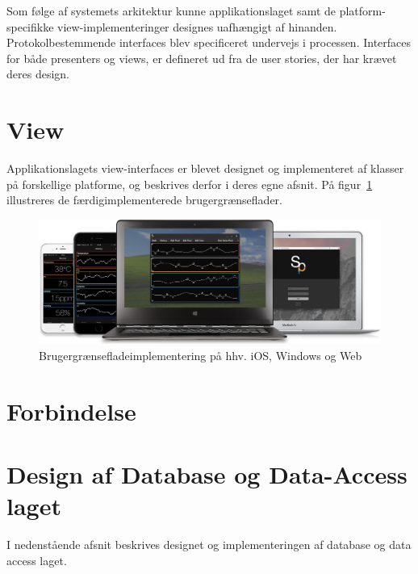 Som følge af systemets arkitektur kunne applikationslaget samt de platform-specifikke view-implementeringer
designes uafhængigt af hinanden. Protokolbestemmende interfaces blev specificeret undervejs i processen. Interfaces for både presenters og views, er defineret ud fra de user stories, der har krævet deres design.




\section{View}
Applikationslagets view-interfaces er blevet designet og implementeret af klasser på forskellige platforme, og beskrives derfor i deres egne afsnit. På figur~\ref{fig:view_family} illustreres de færdigimplementerede brugergrænseflader. 

\begin{figure}
	\centering
	\includegraphics[width=1.0\linewidth]{figs/implementering/view_family}
	\caption{Brugergrænsefladeimplementering på hhv. iOS, Windows og Web}
	\label{fig:view_family}
\end{figure}








\section{Forbindelse}



\section{Design af Database og Data-Access laget}\label{sec:designdatabase}
I nedenstående afsnit beskrives designet og implementeringen af database og data access laget.


